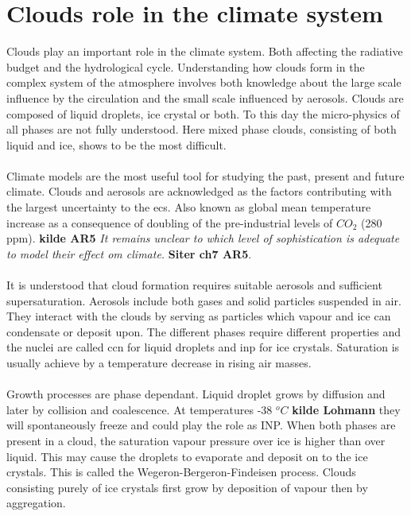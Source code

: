\section{Clouds role in the climate system} \label{sec:cloud_in_climate_system}
Clouds play an important role in the climate system. Both affecting the radiative budget and the hydrological cycle. Understanding how clouds form in the complex system of the atmosphere involves both knowledge about the large scale influence by the circulation and the small scale influenced by aerosols. Clouds are composed of liquid droplets, ice crystal or both. To this day the micro-physics of all phases are not fully understood. Here mixed phase clouds, consisting of both liquid and ice, shows to be the most difficult. 
\\ \\ 
Climate models are the most useful tool for studying the past, present and future climate. Clouds and aerosols are acknowledged as the factors contributing with the largest uncertainty to the \acrfull{ecs}. Also known as global mean temperature increase as a consequence of doubling of the pre-industrial levels of $CO_2$ (280 \acrshort{ppm}). \textbf{kilde AR5} \textit{It remains unclear to which level of sophistication is adequate to model their effect om climate.} \textbf{Siter ch7 AR5}.
\\ \\
It is understood that cloud formation requires suitable aerosols and sufficient supersaturation. Aerosols include both gases and solid particles suspended in air. They interact with the clouds by serving as particles which vapour and ice can condensate or deposit upon. The different phases require different properties and the nuclei are called \acrshort{ccn} for liquid droplets and \acrshort{inp} for ice crystals. Saturation is usually achieve by a temperature decrease in rising air masses. %
\\ \\ 
Growth processes are phase dependant. Liquid droplet grows by diffusion and later by collision and coalescence. At temperatures -38 $^oC$ \textbf{kilde Lohmann} they will spontaneously freeze and could play the role as INP. When both phases are present in a cloud, the saturation vapour pressure over ice is higher than over liquid. This may cause the droplets to evaporate and deposit on to the ice crystals. This is called the Wegeron-Bergeron-Findeisen process. Clouds consisting purely of ice crystals first grow by deposition of vapour then by aggregation. 
